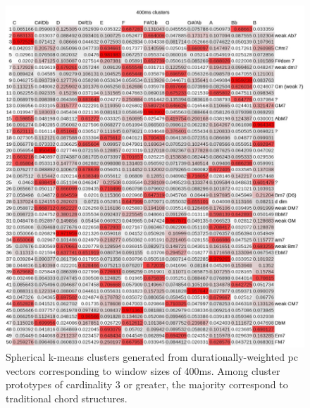 \begin{figure}
	\centering
	\includegraphics[width=6.5in]{400clusters.jpg}
	\caption{Spherical k-means clusters generated from durationally-weighted pc vectors corresponding to window sizes of 400ms.  Among cluster prototypes of cardinality 3 or greater, the majority correspond to traditional chord structures.}
	\label{400clusters}
\end{figure}

